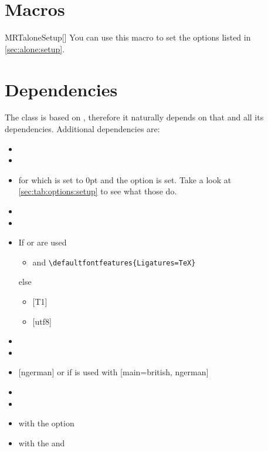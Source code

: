 \section{Macros}%
\begin{describemacro}{MRTaloneSetup}[]%
  You can use this macro to set the options listed in \autoref{sec:alone:setup}.
\end{describemacro}%

\section{Dependencies}\label{sec:alone:dep}%
The class is based on , therefore it naturally depends on that
and all its dependencies. Additional dependencies are:
\begin{multicols}{2}%
  \begin{itemize}[leftmargin=10pt]
    \item {}
    \item {}
    \item {} for which  is set to 0pt and the option
       is set. Take a look at \autoref{sec:tab:options:setup} to
      see what those do.
    \item {}
    \item {}
    \item If  or  are used
      \begin{itemize}[topsep=0pt]
        \item {} and
          \verb|\defaultfontfeatures|\hskip0pt\verb|{Ligatures=TeX}|
      \end{itemize}
      else
      \begin{itemize}[topsep=0pt]
        \item {} [T1]
        \item {} [utf8]
      \end{itemize}
    \item {}
    \item {}
    \item {} [ngerman] or if  is used with
      [main=british, ngerman]
    \item {}
    \item {}
    \item {} with the  option
    \item {} with the  and 

\end{itemize}
\end{multicols}
